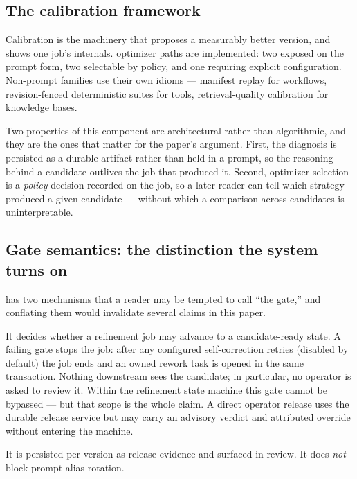 \subsection{The calibration framework}



Calibration is the machinery that proposes a measurably better version, and
 shows one job's internals. \statOptimizersC{} optimizer
paths are implemented: two exposed on the prompt form, two selectable by policy, and one
requiring explicit configuration. Non-prompt families use their own idioms ---
manifest replay for workflows, revision-fenced deterministic suites for tools,
retrieval-quality calibration for knowledge bases.

Two properties of this component are architectural rather than algorithmic, and
they are the ones that matter for the paper's argument. First, the diagnosis is
persisted as a durable artifact rather than held in a prompt, so the reasoning
behind a candidate outlives the job that produced it. Second, optimizer selection is
a \emph{policy} decision recorded on the job, so a later reader can tell which
strategy produced a given candidate --- without which a comparison across candidates
is uninterpretable.

\subsection{Gate semantics: the distinction the system turns on}



\sys has two mechanisms that a reader may be tempted to call ``the gate,'' and
conflating them would invalidate several claims in this paper.

 It decides whether a refinement job may advance
to a candidate-ready state. A failing gate stops the job: after any configured
self-correction retries (disabled by default) the job ends  and an
owned rework task is opened in the same transaction. Nothing downstream sees
the candidate; in particular, no operator is asked to review it. Within the
refinement state machine this gate cannot be bypassed --- but that scope is the
whole claim. A direct operator release uses the durable release service but may
carry an advisory verdict and attributed override without entering the machine.

 It is persisted per version as release
evidence and surfaced in review. It does \emph{not} block prompt alias rotation.

